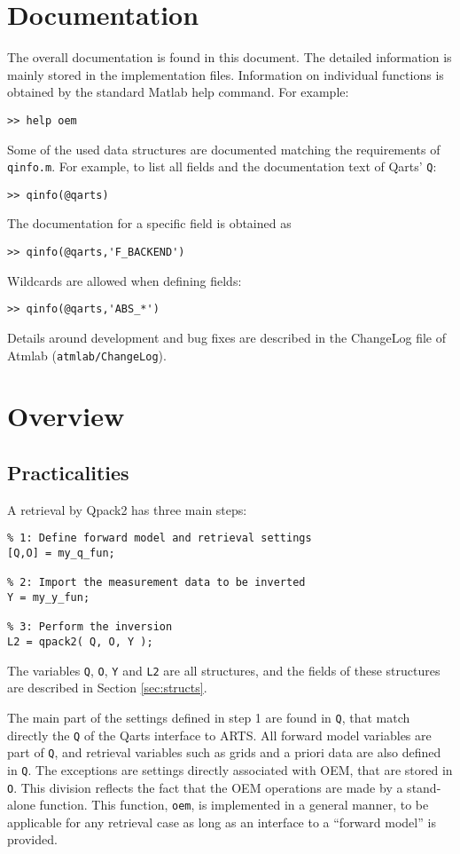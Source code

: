 \documentclass[a4paper,11pt]{article}
\begin{document}
\section{Documentation}
\label{sec:doc}
The overall documentation is found in this document. The detailed information
is mainly stored in the implementation files. Information on individual
functions is obtained by the standard Matlab help command. For example:
\begin{verbatim}
>> help oem
\end{verbatim}
Some of the used data structures are documented matching the requirements of
\verb|qinfo.m|. For example, to list all fields and the documentation text of
Qarts' \verb|Q|:
\begin{verbatim}
>> qinfo(@qarts)
\end{verbatim}
The documentation for a specific field is obtained as
\begin{verbatim}
>> qinfo(@qarts,'F_BACKEND')
\end{verbatim}
Wildcards are allowed when defining fields:
\begin{verbatim}
>> qinfo(@qarts,'ABS_*')
\end{verbatim}
Details around development and bug fixes are described in the ChangeLog file of
Atmlab (\verb|atmlab/ChangeLog|).



\section{Overview}
\label{sec:overview}

\subsection{Practicalities}
%
A retrieval by Qpack2 has three main steps:
\begin{verbatim}
% 1: Define forward model and retrieval settings
[Q,O] = my_q_fun;

% 2: Import the measurement data to be inverted
Y = my_y_fun;

% 3: Perform the inversion
L2 = qpack2( Q, O, Y );
\end{verbatim}
The variables \verb|Q|, \verb|O|, \verb|Y| and \verb|L2| are all structures,
and the fields of these structures are described in Section \ref{sec:structs}.

The main part of the settings defined in step 1 are found in \verb|Q|, that
match directly the \verb|Q| of the Qarts interface to ARTS. All forward model
variables are part of \verb|Q|, and retrieval variables such as grids and a
priori data are also defined in \verb|Q|. The exceptions are settings directly
associated with OEM, that are stored in \verb|O|. This division reflects the
fact that the OEM operations are made by a stand-alone function. This function,
\verb|oem|, is implemented in a general manner, to be applicable for any
retrieval case as long as an interface to a ``forward model'' is provided.
\end{document}
